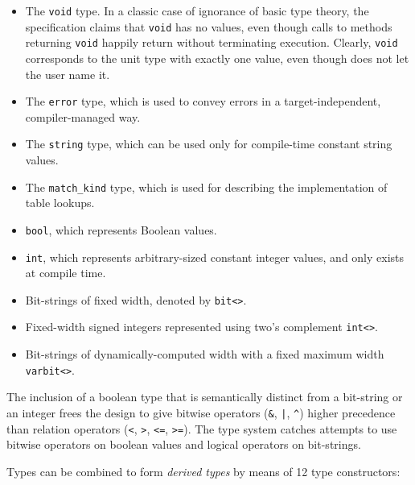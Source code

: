 \begin{itemize}
	\item The \texttt{void} type. In a classic case of ignorance of basic type
	theory, the specification claims that \texttt{void} has no values, even
	though calls to methods returning \texttt{void} happily return without
	terminating execution. Clearly, \texttt{void} corresponds to the unit type
	with exactly one value, even though \pfs does not let the user name it.
	\item The \texttt{error} type, which is used to convey errors in a
	target-independent, compiler-managed way.
	\item The \texttt{string} type, which can be used only for compile-time
	constant string values.
	\item The \texttt{match\_kind} type, which is used for describing the
	implementation of table lookups.
	\item \texttt{bool}, which represents Boolean values.
	\item \texttt{int}, which represents arbitrary-sized constant integer
	values, and only exists at compile time.
	\item Bit-strings of fixed width, denoted by \texttt{bit<>}.
	\item Fixed-width signed integers represented using two's complement
	\texttt{int<>}.
	\item Bit-strings of dynamically-computed width with a fixed maximum width
	\texttt{varbit<>}.
\end{itemize}

The inclusion of a boolean type that is semantically distinct from a bit-string
or an integer frees the design to give bitwise operators (\texttt{\&},
\texttt{|}, \texttt{\^}) higher precedence than relation operators (\texttt{<},
\texttt{>}, \texttt{<=}, \texttt{>=}). The type system catches attempts to use
bitwise operators on boolean values and logical operators on bit-strings.

Types can be combined to form \emph{derived types} by means of 12 type
constructors:

